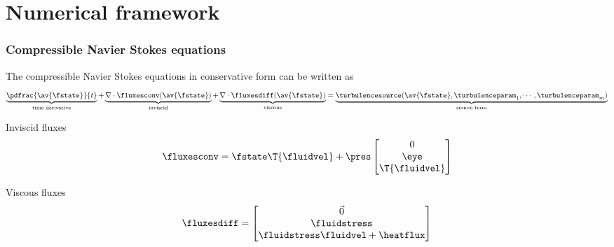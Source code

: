 \section{Numerical framework}



\begin{frame}
\frametitle{Compressible Navier Stokes equations}
The compressible Navier Stokes equations in conservative form can be written as
\begin{equation*}
\underbrace{\pdfrac{\av{\fstate}}{t}}_{\text{time derivative}} +
\underbrace{\nabla\cdot\fluxesconv(\av{\fstate})}_{\text{inviscid}} + 
\underbrace{\nabla\cdot\fluxesdiff(\av{\fstate})}_{\text{viscous}} =
\underbrace{\turbulencesource(\av{\fstate},\turbulenceparam_1,\cdots,\turbulenceparam_m)}_{\text{source term}}
\end{equation*}

Inviscid fluxes
\begin{align*}
\fluxesconv
&=
\fstate \T{\fluidvel} + \pres
\begin{bmatrix}
0\\ \eye \\ \T{\fluidvel}
\end{bmatrix} \\
\end{align*}

Viscous fluxes
\begin{align*}\label{eq:fluxes_diff}
\fluxesdiff&=
\begin{bmatrix}
\vec{0}  \\
\fluidstress \\
\fluidstress \fluidvel + \heatflux
\end{bmatrix} \\
\end{align*}

\end{frame}



